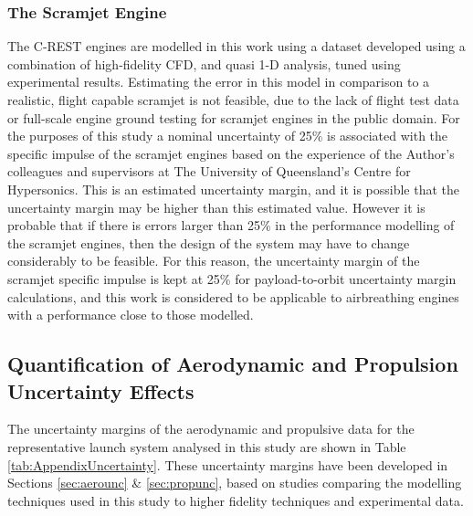\subsubsection{The Scramjet Engine}


The C-REST engines are modelled in this work using a dataset developed using a combination of high-fidelity CFD, and quasi 1-D analysis, tuned using experimental results\cite{Jazra2010}. Estimating the error in this model in comparison to a realistic, flight capable scramjet is not feasible, due to the lack of flight test data or full-scale engine ground testing for scramjet engines in the public domain. For the purposes of this study a nominal uncertainty of 25\% is associated with the specific impulse of the scramjet engines based on the experience of the Author's colleagues and supervisors at The University of Queensland's Centre for Hypersonics. This is an estimated uncertainty margin, and it is possible that the uncertainty margin may be higher than this estimated value. However it is probable that if there is errors larger than 25\% in the performance modelling of the scramjet engines, then the design of the system may have to change considerably to be feasible. For this reason, the uncertainty margin of the scramjet specific impulse is kept at 25\% for payload-to-orbit uncertainty margin calculations, and this work is considered to be applicable to airbreathing engines with a performance close to those modelled.


\subsection{Quantification of Aerodynamic and Propulsion Uncertainty Effects}\label{sec:uncquant}

The uncertainty margins of the aerodynamic and propulsive data for the representative launch system analysed in this study are shown in Table \ref{tab:AppendixUncertainty}. These uncertainty margins have been developed in Sections \ref{sec:aerounc} \& \ref{sec:propunc}, based on studies comparing the modelling techniques used in this study to higher fidelity techniques and experimental data.  

